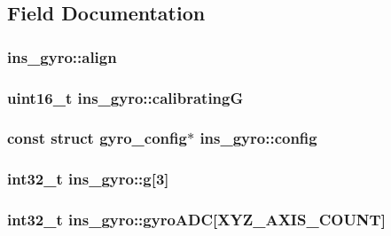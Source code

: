 \subsection{Field Documentation}
\hypertarget{structins__gyro_afa39619d279bb783258ec3e58c6b2bf7}{
\subsubsection[{align}]{ ins\+\_\+gyro\+::align}}\label{structins__gyro_afa39619d279bb783258ec3e58c6b2bf7}
\hypertarget{structins__gyro_a7ffee9eceb683050baa3aedb896d8f2a}{
\subsubsection[{calibrating\+G}]{\setlength{\rightskip}{0pt plus 5cm}uint16\+\_\+t ins\+\_\+gyro\+::calibrating\+G}}\label{structins__gyro_a7ffee9eceb683050baa3aedb896d8f2a}
\hypertarget{structins__gyro_a847cf3732f27512a405d4b84cf27812d}{
\subsubsection[{config}]{\setlength{\rightskip}{0pt plus 5cm}const struct {\bf gyro\+\_\+config}$\ast$ ins\+\_\+gyro\+::config}}\label{structins__gyro_a847cf3732f27512a405d4b84cf27812d}
\hypertarget{structins__gyro_ad25b283565f864656329511ebd3f4d5a}{
\subsubsection[{g}]{\setlength{\rightskip}{0pt plus 5cm}int32\+\_\+t ins\+\_\+gyro\+::g\mbox{[}3\mbox{]}}}\label{structins__gyro_ad25b283565f864656329511ebd3f4d5a}
\hypertarget{structins__gyro_aadd2a1cb02540fb20514f38cc63f6aed}{
\subsubsection[{gyro\+A\+D\+C}]{\setlength{\rightskip}{0pt plus 5cm}int32\+\_\+t ins\+\_\+gyro\+::gyro\+A\+D\+C\mbox{[}{\bf X\+Y\+Z\+\_\+\+A\+X\+I\+S\+\_\+\+C\+O\+U\+N\+T}\mbox{]}}}\label{structins__gyro_aadd2a1cb02540fb20514f38cc63f6aed}
